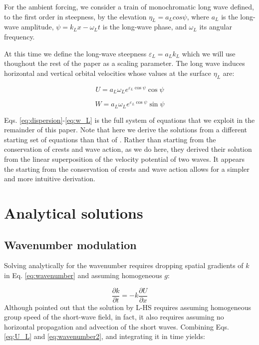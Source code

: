 \documentclass[draft]{agujournal2019}
\begin{document}
For the ambient forcing, we consider a train of monochromatic long wave
defined, to the first order in steepness, by the elevation $\eta_L = a_L cos{\psi}$,
where $a_L$ is the long-wave amplitude, $\psi = k_L x - \omega_L t$ is the
long-wave phase, and $\omega_L$ its angular frequency.

At this time we define the long-wave steepness $\varepsilon_L = a_L k_L$ which
we will use thoughout the rest of the paper as a scaling parameter.
The long wave induces horizontal and vertical orbital velocities whose values
at the surface $\eta_L$ are:

\begin{equation}
\label{eq:U_L}
U = a_L \omega_L e^{\varepsilon_L \cos{\psi}} \cos{\psi}
\end{equation}

\begin{equation}
\label{eq:w_L}
W = a_L \omega_L e^{\varepsilon_L \cos{\psi}} \sin{\psi}
\end{equation}

Eqs. \ref{eq:dispersion}-\ref{eq:w_L} is the full system of equations that we
exploit in the remainder of this paper.
Note that here we derive the solutions from a different starting set of
equations than that of .
Rather than starting from the conservation of crests and wave action, as we do
here, they derived their solution from the linear superposition of the velocity
potential of two waves.
It appears the starting from the conservation of crests and wave action allows
for a simpler and more intuitive derivation.

\section{Analytical solutions}
\label{section:analytical_solutions}

\subsection{Wavenumber modulation}
\label{subsection:wavenumber_modulation}

Solving analytically for the wavenumber requires dropping spatial gradients of
$k$ in Eq. \ref{eq:wavenumber} and assuming homogeneous $g$:

\begin{equation}
\label{eq:wavenumber2}
\dfrac{\partial k}{\partial t}
= - k \dfrac{\partial U}{\partial x}
\end{equation}
Although  pointed out that the solution by L-HS
requires assuming homogeneous group speed of the short-wave field, in fact,
it also requires assuming no horizontal propagation and advection of the short
waves.
Combining Eqs. \ref{eq:U_L} and \ref{eq:wavenumber2}, and integrating it in time
yields:
\end{document}
